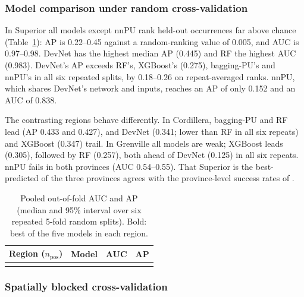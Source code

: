 \documentclass[pdflatex,sn-apa]{sn-jnl}
\begin{document}
\subsubsection{Model comparison under random cross-validation}\label{sec:res-random}

In Superior all models except nnPU rank held-out occurrences far above chance (Table~\ref{tab:benchmark}): AP is 0.22--0.45 against a random-ranking value of 0.005, and AUC is 0.97--0.98. DevNet has the highest median AP (0.445) and RF the highest AUC (0.983). DevNet's AP exceeds RF's, XGBoost's (0.275), bagging-PU's and nnPU's in all six repeated splits, by 0.18--0.26 on repeat-averaged ranks. nnPU, which shares DevNet's network and inputs, reaches an AP of only 0.152 and an AUC of 0.838.

The contrasting regions behave differently. In Cordillera, bagging-PU and RF lead (AP 0.433 and 0.427), and DevNet (0.341; lower than RF in all six repeats) and XGBoost (0.347) trail. In Grenville all models are weak; XGBoost leads (0.305), followed by RF (0.257), both ahead of DevNet (0.125) in all six repeats. nnPU fails in both provinces (AUC 0.54--0.55). That Superior is the best-predicted of the three provinces agrees with the province-level success rates of \citet{Parsa2024}.

\begin{table}[t]
\caption{Pooled out-of-fold AUC and AP (median and 95\% interval over six repeated 5-fold random splits). Bold: best of the five models in each region.}\label{tab:benchmark}
\footnotesize
\begin{tabular*}{\textwidth}{@{\extracolsep\fill}llcc}
\toprule
Region ($n_{\mathrm{pos}}$) & Model & AUC & AP \\
\midrule
\botrule
\end{tabular*}
\end{table}

\subsubsection{Spatially blocked cross-validation}\label{sec:res-spatial}
\end{document}
